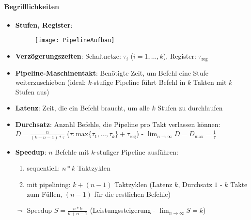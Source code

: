 \paragraph{Begrifflichkeiten}
\begin{itemize}
  \item \textbf{Stufen, Register}:
  \begin{figure}[H]
    \centering
    \label{PipelineAufbau}
    \texttt{[image: PipelineAufbau]}
  \end{figure}

  \item \textbf{Verzögerungszeiten}: Schaltnetze: $\tau_i$ ($i=1,\dots,k$), Register: $\tau_{\text{reg}}$

  \item \textbf{Pipeline-Maschinentakt}: Benötigte Zeit, um Befehl eine Stufe weiterzuschieben (ideal: $k$-stufige Pipeline führt Befehl in $k$ Takten mit $k$ Stufen aus)
  \item \textbf{Latenz}: Zeit, die ein Befehl braucht, um alle $k$ Stufen zu durchlaufen
  \item \textbf{Durchsatz}: Anzahl Befehle, die Pipeline pro Takt verlassen können: $D=\tfrac{n}{(k+n-1)*\tau}$ ($\tau: \text{max}\{ \tau_1,\dots,\tau_k \} + \tau_\text{reg}$) - $\lim_{n \to \infty} D = D_\text{max} = \tfrac{1}{\tau}$
  \item \textbf{Speedup}: $n$ Befehle mit $k$-stufiger Pipeline ausführen:
  \begin{enumerate}
    \item sequentiell: $n*k$ Taktzyklen
    \item mit pipelining: $k+(n-1)$ Taktzyklen (Latenz $k$, Durchsatz $1$ - $k$ Takte zum Füllen, $(n-1)$ für die restlichen Befehle)
  \end{enumerate}
  $\leadsto$ Speedup $S=\tfrac{n*k}{k+n-1}$ (Leistungssteigerung - $\lim_{n \to \infty}S=k$)
\end{itemize}


